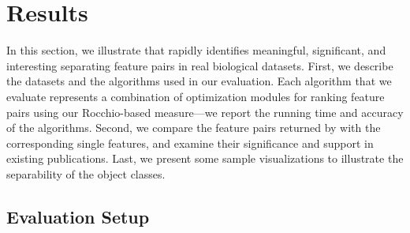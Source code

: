 

\section{Results}
\label{sec:exp}
In this section, we illustrate that \genviz
rapidly identifies meaningful, significant, and interesting
separating feature pairs in real biological datasets.
First, we describe the datasets and the algorithms used
in our evaluation.
Each algorithm that we evaluate
represents a combination of optimization modules
for ranking \topk feature pairs using our
Rocchio-based measure---we report the running time
and accuracy
of the algorithms.
Second, we compare the \topk feature pairs returned by \genviz with the corresponding \topk single features,
and examine their significance and support in existing publications.
Last, we present some sample visualizations to illustrate the separability of the object classes.

\subsection{Evaluation Setup}


